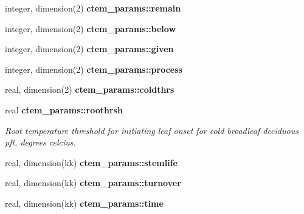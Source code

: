 \begin{DoxyCompactItemize}
\item 
\hypertarget{namespacectem__params_af878fbbc471982423334f1a6d42b9d5a}{}integer, dimension(2) {\bfseries ctem\+\_\+params\+::remain}\label{namespacectem__params_af878fbbc471982423334f1a6d42b9d5a}

\item 
\hypertarget{namespacectem__params_a77c1e7d05344181aff3bf4309627c30c}{}integer, dimension(2) {\bfseries ctem\+\_\+params\+::below}\label{namespacectem__params_a77c1e7d05344181aff3bf4309627c30c}

\item 
\hypertarget{namespacectem__params_acb034f3855b63915db2ed6e8cc0c8e17}{}integer, dimension(2) {\bfseries ctem\+\_\+params\+::given}\label{namespacectem__params_acb034f3855b63915db2ed6e8cc0c8e17}

\item 
\hypertarget{namespacectem__params_a22a7e116bdb2b95a6bc2bdbfb20592db}{}integer, dimension(2) {\bfseries ctem\+\_\+params\+::process}\label{namespacectem__params_a22a7e116bdb2b95a6bc2bdbfb20592db}

\item 
real, dimension(2) {\bfseries ctem\+\_\+params\+::coldthrs}
\item 
\hypertarget{namespacectem__params_a282fb31f18fec9021b409ebbb0a3882c}{}real {\bfseries ctem\+\_\+params\+::roothrsh}\label{namespacectem__params_a282fb31f18fec9021b409ebbb0a3882c}

\begin{DoxyCompactList}\small\item\em Root temperature threshold for initiating leaf onset for cold broadleaf deciduous pft, degrees celcius. \end{DoxyCompactList}\item 
\hypertarget{namespacectem__params_abc90906c9c70649408c5ad72dd96ce35}{}real, dimension(kk) {\bfseries ctem\+\_\+params\+::stemlife}\label{namespacectem__params_abc90906c9c70649408c5ad72dd96ce35}

\item 
\hypertarget{namespacectem__params_a7a81e16ff1c28aff161a88aa2ea0de8d}{}real, dimension(kk) {\bfseries ctem\+\_\+params\+::turnover}\label{namespacectem__params_a7a81e16ff1c28aff161a88aa2ea0de8d}

\item 
\hypertarget{namespacectem__params_aa24f3eafb7be05e7956a39402d95234d}{}real, dimension(kk) {\bfseries ctem\+\_\+params\+::time}\label{namespacectem__params_aa24f3eafb7be05e7956a39402d95234d}


\end{DoxyCompactItemize}
